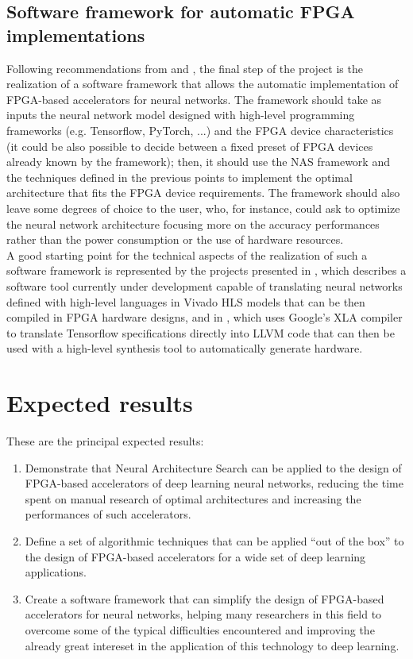 \documentclass[11pt,a4paper]{article}
\begin{document}
\subsection{Software framework for automatic FPGA implementations}
Following recommendations from \cite{wang_survey_2018} and \cite{shawahna_review_2019}, the final step of the project is the realization of a software framework that allows the automatic implementation of FPGA-based accelerators for neural networks. The framework should take as inputs the neural network model designed with high-level programming frameworks (e.g. Tensorflow, PyTorch, ...) and the FPGA device characteristics (it could be also possible to decide between a fixed preset of FPGA devices already known by the framework); then, it should use the NAS framework and the techniques defined in the previous points to implement the optimal architecture that fits the FPGA device requirements. The framework should also leave some degrees of choice to the user, who, for instance, could ask to optimize the neural network architecture focusing more on the accuracy performances rather than the power consumption or the use of hardware resources.
\\A good starting point for the technical aspects of the realization of such a software framework is represented by the projects presented in \cite{duarte_hls4ml_2018}, which describes a software tool currently under development capable of translating neural networks defined with high-level languages in Vivado HLS models that can be then compiled in FPGA hardware designs, and in \cite{noronha_leflow_2018}, which uses Google’s XLA compiler to translate Tensorflow specifications directly into LLVM code that can then be used with a high-level synthesis tool to automatically generate hardware.

\section{Expected results}
These are the principal expected results:
\begin{enumerate}
    \item Demonstrate that Neural Architecture Search can be applied to the design of FPGA-based accelerators of deep learning neural networks, reducing the time spent on manual research of optimal architectures and increasing the performances of such accelerators.
    \item Define a set of algorithmic techniques that can be applied ``out of the box'' to the design of FPGA-based accelerators for a wide set of deep learning applications.
    \item Create a software framework that can simplify the design of FPGA-based accelerators for neural networks, helping many researchers in this field to overcome some of the typical difficulties encountered and improving the already great intereset in the application of this technology to deep learning.
\end{enumerate}



\end{document}
